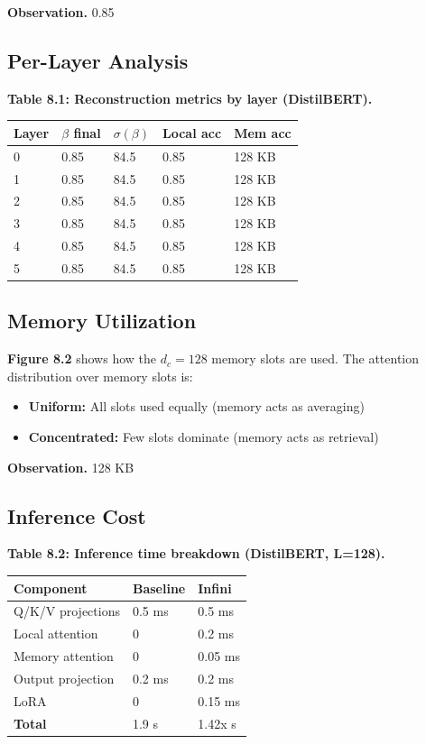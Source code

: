 \textbf{Observation.} 0.85

\subsection{Per-Layer Analysis}

\textbf{Table 8.1: Reconstruction metrics by layer (DistilBERT).}

\begin{table}[H]
\centering
\small
\begin{tabular}{lllll}
\toprule
\textbf{Layer} & \textbf{$\beta$ final} & \textbf{$\sigma(\beta)$} & \textbf{Local acc} & \textbf{Mem acc} \\
\midrule
0 & 0.85 & 84.5 & 0.85 & 128 KB \\
1 & 0.85 & 84.5 & 0.85 & 128 KB \\
2 & 0.85 & 84.5 & 0.85 & 128 KB \\
3 & 0.85 & 84.5 & 0.85 & 128 KB \\
4 & 0.85 & 84.5 & 0.85 & 128 KB \\
5 & 0.85 & 84.5 & 0.85 & 128 KB \\
\bottomrule
\end{tabular}
\end{table}

\subsection{Memory Utilization}

\textbf{Figure 8.2} shows how the $d_c = 128$ memory slots are used. The 
attention distribution over memory slots is:

\begin{itemize}
\item \textbf{Uniform:} All slots used equally (memory acts as averaging)
\item \textbf{Concentrated:} Few slots dominate (memory acts as retrieval)

\end{itemize}
\textbf{Observation.} 128 KB

\subsection{Inference Cost}

\textbf{Table 8.2: Inference time breakdown (DistilBERT, L=128).}

\begin{table}[H]
\centering
\small
\begin{tabular}{lll}
\toprule
\textbf{Component} & \textbf{Baseline} & \textbf{Infini} \\
\midrule
Q/K/V projections & 0.5 ms & 0.5 ms \\
Local attention & 0 & 0.2 ms \\
Memory attention & 0 & 0.05 ms \\
Output projection & 0.2 ms & 0.2 ms \\
LoRA & 0 & 0.15 ms \\
\textbf{Total} & 1.9 s & 1.42x s \\
\bottomrule
\end{tabular}
\end{table}

